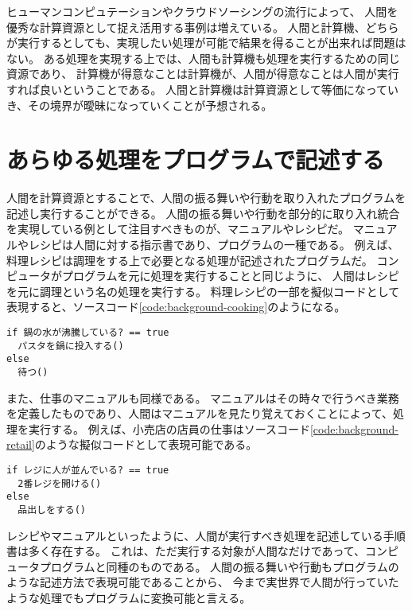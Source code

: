ヒューマンコンピュテーションやクラウドソーシングの流行によって、
人間を優秀な計算資源として捉え活用する事例は増えている。
人間と計算機、どちらが実行するとしても、実現したい処理が可能で結果を得ることが出来れば問題はない。
ある処理を実現する上では、人間も計算機も処理を実行するための同じ資源であり、
計算機が得意なことは計算機が、人間が得意なことは人間が実行すれば良いということである。
人間と計算機は計算資源として等価になっていき、その境界が曖昧になっていくことが予想される。

\section{あらゆる処理をプログラムで記述する}\label{ux3042ux3089ux3086ux308bux51e6ux7406ux3092ux30d7ux30edux30b0ux30e9ux30e0ux3067ux8a18ux8ff0ux3059ux308b}

人間を計算資源とすることで、人間の振る舞いや行動を取り入れたプログラムを記述し実行することができる。
人間の振る舞いや行動を部分的に取り入れ統合を実現している例として注目すべきものが、マニュアルやレシピだ。
マニュアルやレシピは人間に対する指示書であり、プログラムの一種である。
例えば、料理レシピは調理をする上で必要となる処理が記述されたプログラムだ。
コンピュータがプログラムを元に処理を実行することと同じように、
人間はレシピを元に調理という名の処理を実行する。
料理レシピの一部を擬似コードとして表現すると、ソースコード\ref{code:background-cooking}のようになる。

\begin{lstlisting}[caption=料理レシピの一部の擬似コードで表す, label=code:background-cooking]
if 鍋の水が沸騰している? == true
  パスタを鍋に投入する()
else
  待つ()
\end{lstlisting}

また、仕事のマニュアルも同様である。
マニュアルはその時々で行うべき業務を定義したものであり、人間はマニュアルを見たり覚えておくことによって、処理を実行する。
例えば、小売店の店員の仕事はソースコード\ref{code:background-retail}のような擬似コードとして表現可能である。

\begin{lstlisting}[caption=小売店の店員の挙動の一部を擬似コードで表す, label=code:background-retail]
if レジに人が並んでいる? == true
  2番レジを開ける()
else
  品出しをする()
\end{lstlisting}

レシピやマニュアルといったように、人間が実行すべき処理を記述している手順書は多く存在する。
これは、ただ実行する対象が人間なだけであって、コンピュータプログラムと同種のものである。
人間の振る舞いや行動もプログラムのような記述方法で表現可能であることから、
今まで実世界で人間が行っていたような処理でもプログラムに変換可能と言える。

